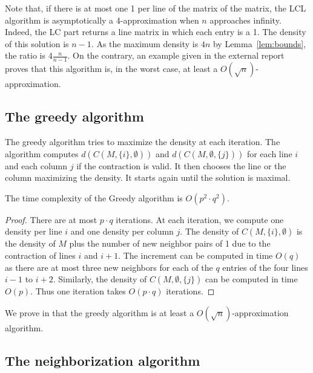 \begin{remark}
	Note that, if there is at most one 1 per line of the matrix of the matrix, the LCL algorithm is asymptotically a 4-approximation when $n$ approaches infinity. Indeed, the LC part returns a line matrix in which each entry is a 1. The density of this solution is $n-1$. As the maximum density is $4n$ by Lemma~\ref{lem:bounds}, the ratio is $4\frac{n}{n-1}$. On the contrary, an example given in the external report \cite{WatelPoirionAppendix} proves that this algorithm is, in the worst case, at least a $O(\sqrt{n})$-approximation. 
\end{remark} 

\subsection{The greedy algorithm}

The greedy algorithm tries to maximize the density at each iteration. The algorithm computes $d(C(M,\{i\},\emptyset))$ and $d(C(M,\emptyset, \{j\}))$ for each line $i$ and each column $j$ if the contraction is valid. It then chooses the line or the column maximizing the density. It starts again until the solution is maximal.

\begin{theorem}
	The time complexity of the Greedy algorithm is $O(p^2 \cdot q^2)$. 
\end{theorem}
\begin{proof}
	There are at most $p \cdot q$ iterations. At each iteration, we compute one density per line $i$ and one density per column $j$. The density of $C(M,\{i\},\emptyset)$ is the density of $M$ plus the number of new neighbor pairs of 1 due to the contraction of lines $i$ and $i+1$. The increment can be computed in time $O(q)$ as there are at most three new neighbors for each of the $q$ entries of the four lines $i-1$ to $i+2$. Similarly, the density of $C(M,\emptyset,\{j\})$ can be computed in time $O(p)$. Thus one iteration takes $O(p \cdot q)$ iterations. 
\end{proof}

\begin{remark}
	We prove in \cite{WatelPoirionAppendix} that the greedy algorithm is at least a $O(\sqrt{n})$-approximation algorithm.
\end{remark}

\subsection{The neighborization algorithm}


